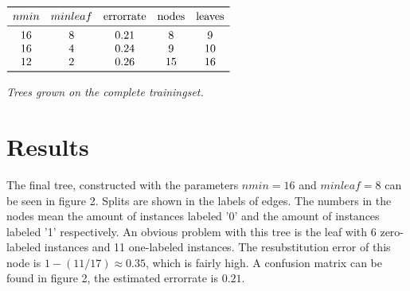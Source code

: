 \documentclass[a4paper,12pt]{scrartcl}
\begin{document}
    \begin{table}[!htb]
    \small  

        \centering
        $\begin{array}{ *{5}{c} }
            \toprule
            nmin & minleaf & \text{errorrate} & \text{nodes} & \text{leaves} \\
            \midrule
                16 & 8 & 0.21 & 8 & 9 \\
                16 & 4 & 0.24 & 9 & 10 \\
                12 & 2 & 0.26 & 15 & 16 \\
            \bottomrule
        \end{array}$
        \caption{\textit{Trees grown on the complete trainingset.}}
    \end{table}

\clearpage
\section{Results}
The final tree, constructed with the parameters $nmin=16$ and $minleaf=8$ can be seen in figure 2. Splits are shown in the labels of edges. The numbers in the nodes mean the amount of instances labeled '0' and the amount of instances labeled '1' respectively. An obvious problem with this tree is the leaf with 6 zero-labeled instances and 11 one-labeled instances. The resubstitution error of this node is $1 - (11/17) \approx 0.35$, which is fairly high. A confusion matrix can be found in figure 2, the estimated errorrate is $0.21$.
\\\\
\end{document}
